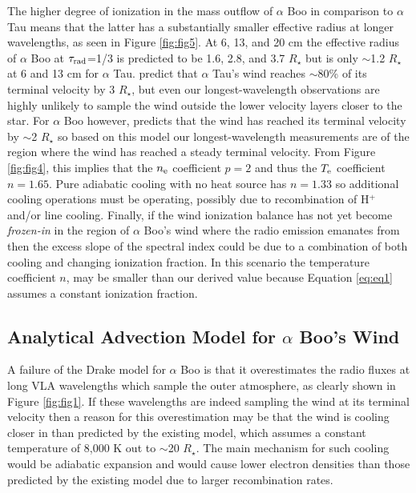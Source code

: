 \documentclass[iop]{emulateapj}
\begin{document}
The higher degree of ionization in the mass outflow of $\alpha$ Boo in comparison to $\alpha$ Tau means that the latter has a substantially smaller effective radius at longer wavelengths, as seen in Figure \ref{fig:fig5}. At 6, 13, and 20 cm the effective radius of $\alpha$ Boo at $\tau _{\rm{rad}}$=1/3 is predicted to be 1.6, 2.8, and 3.7 $R_{\star}$ but is only $\sim$1.2 $R_{\star}$ at 6 and 13 cm for $\alpha$ Tau. \cite{1998ApJ...503..396R} predict that $\alpha$ Tau's wind reaches $\sim$80\% of its terminal velocity by 3 $R_{\star}$, but even our longest-wavelength observations are highly unlikely to sample the wind outside the lower velocity layers closer to the star. For $\alpha$ Boo however, \cite{1985pssl.proc..351D} predicts that the wind has reached its terminal velocity by $\sim$2 $R_{\star}$ so based on this model our longest-wavelength measurements are of the region where the wind has reached a steady terminal velocity. From Figure \ref{fig:fig4}, this implies that the $n_{\rm{e}}$ coefficient $p=2$ and thus the $T_{\rm{e}}$ coefficient $n=1.65$. Pure adiabatic cooling with no heat source has $n=1.33$ so additional cooling operations must be operating, possibly due to recombination of H$^{+}$ and/or line cooling. Finally, if the wind ionization balance has not yet become \textit{frozen-in} in the region of $\alpha$ Boo's wind where the radio emission emanates from then the excess slope of the spectral index could be due to a combination of both cooling and changing ionization fraction. In this scenario the temperature coefficient $n$, may be smaller than our derived value because Equation \ref{eq:eq1} assumes a constant ionization fraction.

\subsection{Analytical Advection Model for $\alpha$ Boo's Wind} \label{disc:disc4}

A failure of the Drake model for $\alpha$ Boo is that it overestimates the radio fluxes at long VLA wavelengths which sample the outer atmosphere, as clearly shown in Figure \ref{fig:fig1}. If these wavelengths are indeed sampling the wind at its terminal velocity then a reason for this overestimation may be that the wind is cooling closer in than predicted by the existing model, which assumes a constant temperature of 8,000 K out to $\sim$20 $R_{\star}$. The main mechanism for such cooling would be adiabatic expansion \citep{2011ASPC..448..691O} and would cause lower electron densities than those predicted by the existing model due to larger recombination rates. 
\end{document}
